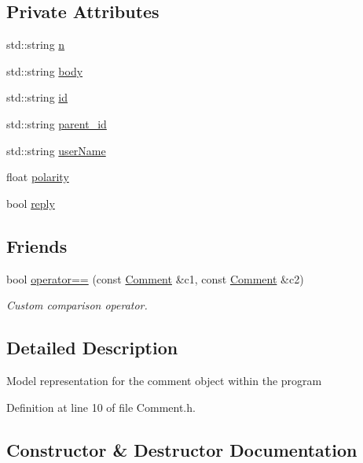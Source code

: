 \subsection*{Private Attributes}
\begin{DoxyCompactItemize}
\item 
std\+::string \hyperlink{class_comment_a28bb2d16cad342d68d84b184c4ce07ba}{n}
\item 
std\+::string \hyperlink{class_comment_af8df10ee9d38440d5c4d500ccc9f2519}{body}
\item 
std\+::string \hyperlink{class_comment_a63db6067036146247c4ab7f663d90369}{id}
\item 
std\+::string \hyperlink{class_comment_abc88c0f64df05cb3d29ad1c7aa1621c5}{parent\+\_\+id}
\item 
std\+::string \hyperlink{class_comment_ad477f53e20e76aa9352926f93ccc7a56}{user\+Name}
\item 
float \hyperlink{class_comment_a617b67425b39c1f5f1eb0ada3d4bbd74}{polarity}
\item 
bool \hyperlink{class_comment_a7b8ceeb67364d5e08299baeeff38ba03}{reply}
\end{DoxyCompactItemize}
\subsection*{Friends}
\begin{DoxyCompactItemize}
\item 
bool \hyperlink{class_comment_ac5edd8dbab6e9d702dcdde889b96c250}{operator==} (const \hyperlink{class_comment}{Comment} \&c1, const \hyperlink{class_comment}{Comment} \&c2)
\begin{DoxyCompactList}\small\item\em Custom comparison operator. \end{DoxyCompactList}\end{DoxyCompactItemize}


\subsection{Detailed Description}
Model representation for the comment object within the program 

Definition at line 10 of file Comment.\+h.



\subsection{Constructor \& Destructor Documentation}
\mbox{\label{class_comment_aa72817b1d59ba65d90a924e0ca056bee}} 
